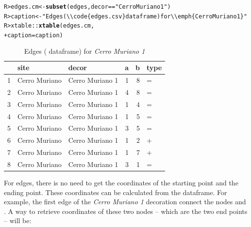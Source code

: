 \documentclass[article]{jss}\usepackage[]{graphicx}\usepackage[]{color}
\makeatletter
\newcommand{\hlstr}[1]{\textcolor[rgb]{0.192,0.494,0.8}{#1}}%
\newcommand{\hlopt}[1]{\textcolor[rgb]{0,0,0}{#1}}%
\newcommand{\hlstd}[1]{\textcolor[rgb]{0.345,0.345,0.345}{#1}}%
\newcommand{\hlkwb}[1]{\textcolor[rgb]{0.69,0.353,0.396}{#1}}%
\newcommand{\hlkwc}[1]{\textcolor[rgb]{0.333,0.667,0.333}{#1}}%
\newcommand{\hlkwd}[1]{\textcolor[rgb]{0.737,0.353,0.396}{\textbf{#1}}}%
\newenvironment{kframe}{%
 \def\at@end@of@kframe{}%
 \ifinner\ifhmode%
  \def\at@end@of@kframe{\end{minipage}}%
  \begin{minipage}{\columnwidth}%
 \fi\fi%
 \def\FrameCommand##1{\hskip\@totalleftmargin \hskip-\fboxsep
 \colorbox{shadecolor}{##1}\hskip-\fboxsep
     \hskip-\linewidth \hskip-\@totalleftmargin \hskip\columnwidth}%
 \MakeFramed {\advance\hsize-\width
   \@totalleftmargin\z@ \linewidth\hsize
   \@setminipage}}%
 {\par\unskip\endMakeFramed%
 \at@end@of@kframe}
\makeatother
\begin{document}
\begin{kframe}
\begin{alltt}
\hlstd{R> }\hlstd{edges.cm} \hlkwb{<-} \hlkwd{subset}\hlstd{(edges, decor} \hlopt{==} \hlstr{"Cerro Muriano 1"}\hlstd{)}
\hlstd{R> }\hlstd{caption} \hlkwb{<-} \hlstr{"Edges (\textbackslash{}\textbackslash{}code\{edges.csv\} dataframe) for \textbackslash{}\textbackslash{}emph\{Cerro Muriano 1\}"}
\hlstd{R> }\hlstd{xtable}\hlopt{::}\hlkwd{xtable}\hlstd{(edges.cm,}
\hlstd{+ }               \hlkwc{caption}\hlstd{=caption)}
\end{alltt}
\end{kframe}%
\begin{table}[ht]
\centering
\begin{tabular}{rllrrl}
  \hline
 & site & decor & a & b & type \\ 
  \hline
1 & Cerro Muriano & Cerro Muriano 1 &   1 &   8 & = \\ 
  2 & Cerro Muriano & Cerro Muriano 1 &   4 &   8 & = \\ 
  3 & Cerro Muriano & Cerro Muriano 1 &   1 &   4 & = \\ 
  4 & Cerro Muriano & Cerro Muriano 1 &   1 &   5 & = \\ 
  5 & Cerro Muriano & Cerro Muriano 1 &   3 &   5 & = \\ 
  6 & Cerro Muriano & Cerro Muriano 1 &   1 &   2 & + \\ 
  7 & Cerro Muriano & Cerro Muriano 1 &   1 &   7 & + \\ 
  8 & Cerro Muriano & Cerro Muriano 1 &   3 &   1 & = \\ 
   \hline
\end{tabular}
\caption{Edges ( dataframe) for \emph{Cerro Muriano 1}} 
\end{table}


For edges, there is no need to get the coordinates of the starting point and the ending point. These coordinates can be calculated from the  dataframe. For example, the first edge of the \emph{Cerro Muriano 1} decoration connect the nodes  and . A way to retrieve coordinates of these two nodes -- which are the two end points -- will be:
\end{document}
